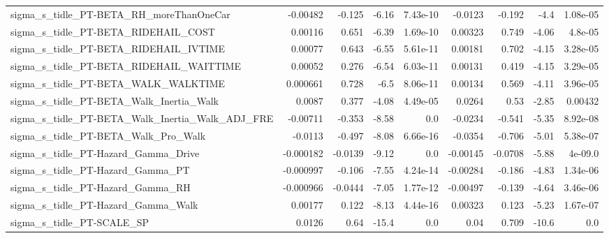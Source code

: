 \begin{tabular}{lrrrrrrrr}
sigma\_s\_tidle\_PT-BETA\_RH\_moreThanOneCar            &    -0.00482 &       -0.125 &    -6.16 & 7.43e-10 &    -0.0123 &      -0.192 &         -4.4 &      1.08e-05 \\
sigma\_s\_tidle\_PT-BETA\_RIDEHAIL\_COST                &     0.00116 &        0.651 &    -6.39 & 1.69e-10 &    0.00323 &       0.749 &        -4.06 &       4.8e-05 \\
sigma\_s\_tidle\_PT-BETA\_RIDEHAIL\_IVTIME              &     0.00077 &        0.643 &    -6.55 & 5.61e-11 &    0.00181 &       0.702 &        -4.15 &      3.28e-05 \\
sigma\_s\_tidle\_PT-BETA\_RIDEHAIL\_WAITTIME            &     0.00052 &        0.276 &    -6.54 & 6.03e-11 &    0.00131 &       0.419 &        -4.15 &      3.29e-05 \\
sigma\_s\_tidle\_PT-BETA\_WALK\_WALKTIME                &    0.000661 &        0.728 &     -6.5 & 8.06e-11 &    0.00134 &       0.569 &        -4.11 &      3.96e-05 \\
sigma\_s\_tidle\_PT-BETA\_Walk\_Inertia\_Walk            &      0.0087 &        0.377 &    -4.08 & 4.49e-05 &     0.0264 &        0.53 &        -2.85 &       0.00432 \\
sigma\_s\_tidle\_PT-BETA\_Walk\_Inertia\_Walk\_ADJ\_FRE    &    -0.00711 &       -0.353 &    -8.58 &      0.0 &    -0.0234 &      -0.541 &        -5.35 &      8.92e-08 \\
sigma\_s\_tidle\_PT-BETA\_Walk\_Pro\_Walk                &     -0.0113 &       -0.497 &    -8.08 & 6.66e-16 &    -0.0354 &      -0.706 &        -5.01 &      5.38e-07 \\
sigma\_s\_tidle\_PT-Hazard\_Gamma\_Drive                &   -0.000182 &      -0.0139 &    -9.12 &      0.0 &   -0.00145 &     -0.0708 &        -5.88 &       4e-09.0 \\
sigma\_s\_tidle\_PT-Hazard\_Gamma\_PT                   &   -0.000997 &       -0.106 &    -7.55 & 4.24e-14 &   -0.00284 &      -0.186 &        -4.83 &      1.34e-06 \\
sigma\_s\_tidle\_PT-Hazard\_Gamma\_RH                   &   -0.000966 &      -0.0444 &    -7.05 & 1.77e-12 &   -0.00497 &      -0.139 &        -4.64 &      3.46e-06 \\
sigma\_s\_tidle\_PT-Hazard\_Gamma\_Walk                 &     0.00177 &        0.122 &    -8.13 & 4.44e-16 &    0.00323 &       0.123 &        -5.23 &      1.67e-07 \\
sigma\_s\_tidle\_PT-SCALE\_SP                          &      0.0126 &         0.64 &    -15.4 &      0.0 &       0.04 &       0.709 &        -10.6 &           0.0 \\

\end{tabular}
